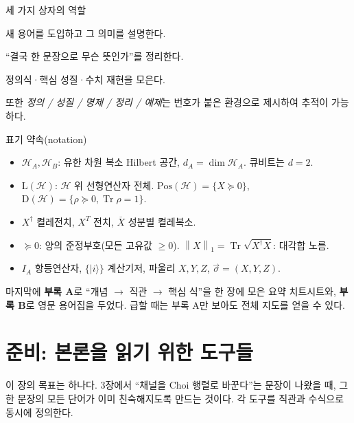 \documentclass[11pt,a4paper]{article}
\newcommand{\Hcal}{\mathcal{H}}
\newcommand{\Tr}{\operatorname{Tr}}
\newcommand{\Pos}{\mathrm{Pos}}
\newcommand{\Dens}{\mathrm{D}}
\newcommand{\Lin}{\mathrm{L}}
\newcommand{\onenorm}[1]{\left\lVert #1 \right\rVert_{1}}
\theoremstyle{definition}
\theoremstyle{plain}
\theoremstyle{remark}
\begin{document}
\begin{conceptbox}{세 가지 상자의 역할}
\begin{description}[leftmargin=1.4em,style=nextline]
  \item[\textcolor{blue!60!black}{$\blacksquare$} 개념 상자 (파랑)] 새 용어를 도입하고 그 의미를 설명한다.
  \item[\textcolor{green!50!black}{$\blacksquare$} 직관 요약 (초록)] ``결국 한 문장으로 무슨 뜻인가''를 정리한다.
  \item[\textcolor{orange!70!black}{$\blacksquare$} 수식 상자 (주황)] 정의식·핵심 성질·수치 재현을 모은다.
\end{description}
또한 \emph{정의 / 성질 / 명제 / 정리 / 예제}는 번호가 붙은 환경으로 제시하여 추적이 가능하다.
\end{conceptbox}

\begin{conceptbox}{표기 약속(notation)}
\begin{itemize}[leftmargin=1.4em]
  \item $\Hcal_A,\Hcal_B$: 유한 차원 복소 Hilbert 공간, $d_A=\dim\Hcal_A$. 큐비트는 $d=2$.
  \item $\Lin(\Hcal)$: $\Hcal$ 위 선형연산자 전체. $\Pos(\Hcal)=\{X\succeq0\}$, $\Dens(\Hcal)=\{\rho\succeq0,\Tr\rho=1\}$.
  \item $X^\dagger$ 켤레전치, $X^T$ 전치, $\overline{X}$ 성분별 켤레복소.
  \item $\succeq0$: 양의 준정부호(모든 고유값 $\ge0$). $\onenorm{X}=\Tr\sqrt{X^\dagger X}$: 대각합 노름.
  \item $I_A$ 항등연산자, $\{|i\rangle\}$ 계산기저, 파울리 $X,Y,Z$, $\vec\sigma=(X,Y,Z)$.
\end{itemize}
\end{conceptbox}

마지막에 \textbf{부록 A}로 ``개념 $\to$ 직관 $\to$ 핵심 식''을 한 장에 모은 요약 치트시트와, \textbf{부록 B}로 영문 용어집을 두었다. 급할 때는 부록 A만 보아도 전체 지도를 얻을 수 있다.

\section{준비: 본론을 읽기 위한 도구들}

이 장의 목표는 하나다. 3장에서 ``채널을 Choi 행렬로 바꾼다''는 문장이 나왔을 때, 그 한 문장의 모든 단어가 이미 친숙해지도록 만드는 것이다. 각 도구를 직관과 수식으로 동시에 정의한다.
\end{document}

